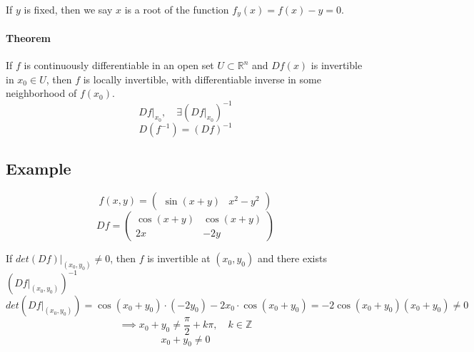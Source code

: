 \documentclass[11pt]{article}
\begin{document}
If $y$ is fixed, then we say $x$ is a root of the function $f_y(x) = f(x) - y = 0$.

\paragraph{Theorem}
If $f$ is continuously differentiable in an open set $U \subset \mathbb{R}^n$ and $Df(x)$ is invertible in $x_0 \in U$, then $f$ is locally invertible, with differentiable inverse in some neighborhood of $f(x_0)$.
\[
Df \big|_{x_0}, \quad \exists (Df \big|_{x_0})^{-1}
\]
\[
D(f^{-1}) = (Df)^{-1}
\]

\subsection*{Example}
\[
f(x,y) = \begin{pmatrix}
    \sin (x + y) & x^2 - y^2
\end{pmatrix}
\]
\[
Df = \begin{pmatrix}
    \cos (x + y) & \cos (x + y) \\
    2x & -2y
\end{pmatrix}
\]

If $det(Df)\big|_{(x_0,y_0)} \neq 0$, then $f$ is invertible at $(x_0,y_0)$ and there exists $(Df \big|_{(x_0,y_0)})^{-1}$
\[
det(Df \big|_{(x_0,y_0)}) = \cos (x_0 + y_0) \cdot (-2y_0) - 2x_0 \cdot \cos (x_0 + y_0) = -2 \cos (x_0 + y_0) (x_0 + y_0) \neq 0
\]
\[
\implies x_0 + y_0 \neq \frac{\pi}{2} + k \pi, \quad k \in \mathbb{Z}
\]
\[
x_0 + y_0 \neq 0
\]
\end{document}
